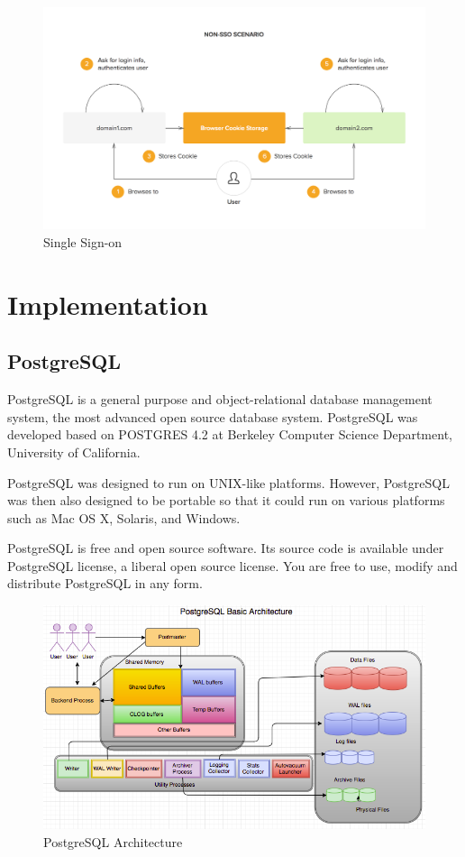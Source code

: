 \documentclass[a4paper,12pt,oneside]{book}
\begin{document}
\begin{figure}
    \centering
    \includegraphics[width=\textwidth]{images/sso.png}
    \caption{Single Sign-on}
    \label{fig:sso}
\end{figure}

\lipsum[3]


\chapter{Implementation}
\lipsum[5]

\section{PostgreSQL}
PostgreSQL is a general purpose and object-relational database management system, the most advanced open source database system. PostgreSQL was developed based on POSTGRES 4.2 at Berkeley Computer Science Department, University of California.

PostgreSQL was designed to run on UNIX-like platforms. However, PostgreSQL was then also designed to be portable so that it could run on various platforms such as Mac OS X, Solaris, and Windows.

PostgreSQL is free and open source software. Its source code is available under PostgreSQL license, a liberal open source license. You are free to use, modify and distribute PostgreSQL in any form.

\begin{figure}
    \centering
    \includegraphics[width=\textwidth]{images/pg.png}
    \caption{PostgreSQL Architecture}
    \label{fig:pg}
\end{figure}
\end{document}
